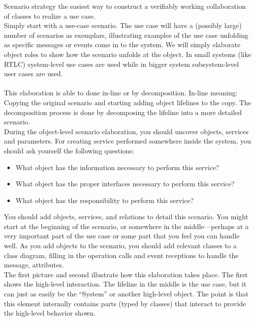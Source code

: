 \documentclass[12pt,a4paper]{article}
\begin{document}
Scenario strategy the easiest way to construct a verifiably working
collaboration of classes to realize a use case. \\ Simply start with a use-case scenario. The use case will have a (possibly large) number
of scenarios as exemplars, illustrating examples of the use case unfolding as specific messages or events come in to the system. We will simply
elaborate object roles to show how the scenario unfolds at the object. In small systems (like RTLC) system-level use cases are used while in bigger system subsystem-level user cases are used. \\ \\
This elaboration is able to done in-line or by decomposition. In-line meaning: 
Copying the original scenario and starting adding object lifelines to the copy. The decomposition process is done by decomposing the lifeline into a more detailed scenario. 
\\
During the object-level scenario elaboration, you should uncover objects, services and parameters.
For creating service performed somewhere inside the system, you should ask yourself the following questions:
\begin{itemize}
\item What object has the information necessary to perform this service?
\item What object has the proper interfaces necessary to perform this service?
\item What object has the responsibility to perform this service?
\end{itemize}


You should add objects, services, and relations to detail this scenario. You might start at the beginning of the scenario, or somewhere in the middle—perhaps at a very important part of the use case or some part that you feel you can handle well. As you add objects to the scenario, you should add relevant classes to a class diagram, filling in the operation calls and event receptions to handle the message, attributes. \\

The first picture and second illustrate how this elaboration takes place. The first shows the high-level interaction. The lifeline in the middle is the use case, but it can just as easily be the “System” or another high-level object. The point is that
this element internally contains parts (typed by classes) that interact to provide the high-level behavior shown. \\\\
\end{document}
